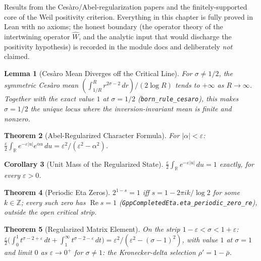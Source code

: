 \documentclass{report}
\newtheorem{theorem}{Theorem}[chapter]
\newtheorem{lemma}[theorem]{Lemma}
\newtheorem{corollary}[theorem]{Corollary}
\theoremstyle{definition}
\begin{document}
Results from the Ces\`aro/Abel-regularization papers and the finitely-supported
core of the Weil positivity criterion. Everything in this chapter is fully proved
in Lean with no axioms; the honest boundary (the operator theory of the intertwining
operator $\hat W$, and the analytic input that would discharge the positivity
hypothesis) is recorded in the module docs and deliberately \emph{not} claimed.

\begin{lemma}[Ces\`aro Mean Diverges off the Critical Line]
  \label{lem:cesaro-divergence}
  \leanok
  For $\sigma \neq 1/2$, the symmetric Ces\`aro mean
  $(\int_{1/R}^{R} r^{2\sigma-2}\,dr)/(2\log R)$ tends to $+\infty$ as $R \to \infty$.
  Together with the exact value $1$ at $\sigma = 1/2$ (\texttt{born\_rule\_cesaro}),
  this makes $\sigma = 1/2$ the unique locus where the inversion-invariant mean is
  finite and nonzero.
\end{lemma}

\begin{theorem}[Abel-Regularized Character Formula]
  \label{thm:abel-character}
  \leanok
  For $|\alpha| < \varepsilon$:
  $\tfrac{\varepsilon}{2}\int_{\mathbb R} e^{-\varepsilon|u|}e^{\alpha u}\,du
  = \varepsilon^2/(\varepsilon^2 - \alpha^2)$.
\end{theorem}

\begin{corollary}[Unit Mass of the Regularized State]
  \label{cor:abel-state-one}
  \leanok
  $\tfrac{\varepsilon}{2}\int_{\mathbb R} e^{-\varepsilon|u|}\,du = 1$ exactly, for
  every $\varepsilon > 0$.
\end{corollary}

\begin{theorem}[Periodic Eta Zeros]
  \label{thm:eta-periodic}
  \leanok
  $2^{1-s} = 1$ iff $s = 1 - 2\pi i k/\log 2$ for some $k \in \mathbb Z$; every such
  zero has $\operatorname{Re} s = 1$
  (\texttt{GppCompletedEta.eta\_periodic\_zero\_re}), outside the open critical strip.
\end{theorem}

\begin{theorem}[Regularized Matrix Element]
  \label{thm:yaka-element}
  \leanok
  On the strip $1 - \varepsilon < \sigma < 1 + \varepsilon$:
  $\tfrac{\varepsilon}{2}\bigl(\int_0^1 t^{\sigma-2+\varepsilon}\,dt
  + \int_1^\infty t^{\sigma-2-\varepsilon}\,dt\bigr)
  = \varepsilon^2/(\varepsilon^2-(\sigma-1)^2)$, with value $1$ at $\sigma = 1$ and
  limit $0$ as $\varepsilon \to 0^+$ for $\sigma \neq 1$: the Kronecker-delta
  selection $\rho' = 1-\bar\rho$.
\end{theorem}
\end{document}
